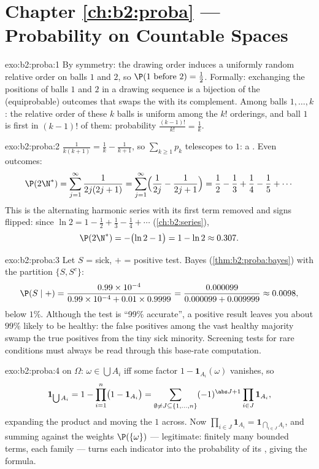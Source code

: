 \section*{Chapter \ref{ch:b2:proba} --- Probability on Countable Spaces}

\begin{solution}{exo:b2:proba:1}
By symmetry: the drawing order induces a uniformly random relative
order on balls $1$ and $2$, so $\P(1 \text{ before } 2) =
\frac12$. Formally: exchanging the positions of balls $1$ and $2$
in a drawing sequence is a bijection of the (equiprobable)
outcomes that swaps the  with its complement. Among balls
$1, \dots, k$: the relative order of these $k$ balls is uniform
among the $k!$ orderings, and ball $1$ is first in $(k-1)!$ of
them: probability $\frac{(k-1)!}{k!} = \frac1k$.
\end{solution}

\begin{solution}{exo:b2:proba:2}
$\frac{1}{k(k+1)} = \frac1k - \frac1{k+1}$, so $\sum_{k\geq1} p_k$
telescopes to $1$: a . Even outcomes:
\[
\P(2\N^*) = \sum_{j=1}^{\infty}\frac{1}{2j(2j+1)}
= \sum_{j=1}^{\infty}\Bigl(\frac{1}{2j} - \frac{1}{2j+1}\Bigr)
= \frac12 - \frac13 + \frac14 - \frac15 + \cdots
\]
This is the alternating harmonic series with its first term
removed and signs flipped: since $\ln 2 = 1 - \frac12 + \frac13 -
\frac14 + \cdots$ (\cref{ch:b2:series}),
\[
\P(2\N^*) = -\bigl(\ln 2 - 1\bigr) = 1 - \ln 2 \approx 0.307 .
\]
\end{solution}

\begin{solution}{exo:b2:proba:3}
Let $S$ = sick, $+$ = positive test. Bayes
(\cref{thm:b2:proba:bayes}) with the partition $\{S, S^c\}$:
\[
\P(S \mid +)
= \frac{0.99 \times 10^{-4}}
       {0.99 \times 10^{-4} + 0.01 \times 0.9999}
= \frac{0.000099}{0.000099 + 0.009999}
\approx 0.0098 ,
\]
below $1\%$. Although the test is ``99\% accurate'', a positive
result leaves you about $99\%$ likely to be healthy: the false
positives among the vast healthy majority swamp the true
positives from the tiny sick minority. Screening tests for rare
conditions must always be read through this base-rate
computation.
\end{solution}

\begin{solution}{exo:b2:proba:4}
 on $\Omega$: $\omega \in \bigcup A_i$ iff some factor
$1 - \mathbf{1}_{A_i}(\omega)$ vanishes, so
\[
\mathbf{1}_{\bigcup A_i}
= 1 - \prod_{i=1}^n\bigl(1 - \mathbf{1}_{A_i}\bigr)
= \sum_{\emptyset \neq J \subseteq \{1,\dots,n\}}
(-1)^{\abs J + 1}\prod_{i \in J}\mathbf{1}_{A_i} ,
\]
expanding the product and moving the $1$ across. Now
$\prod_{i\in J}\mathbf{1}_{A_i} = \mathbf{1}_{\bigcap_{i \in J}
A_i}$, and summing against the weights $\P(\{\omega\})$ ---
legitimate: finitely many bounded terms, each family  ---
turns each indicator into the probability of its , giving
the formula.
\end{solution}

